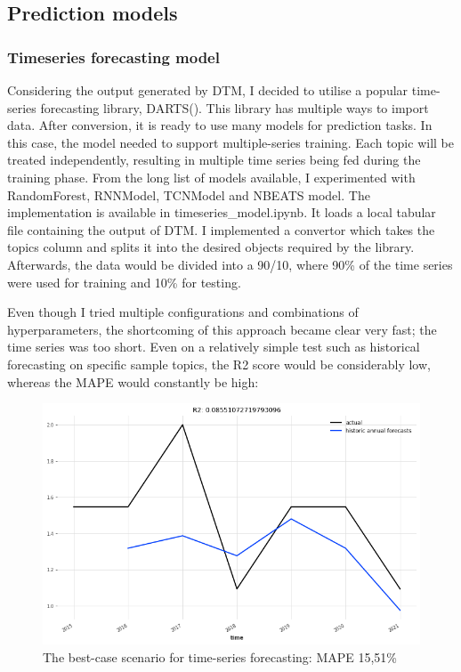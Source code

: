 \documentclass[12pt,MSc,a4paper,oneside]{muthesis}
\begin{document}
    \subsection{Prediction models}
    \subsubsection{Timeseries forecasting model}

    Considering the output generated by DTM, I decided to utilise a popular time-series forecasting library, DARTS(\cite{herzen2021darts}). This library has multiple ways to import data. After conversion, it is ready to use many models for prediction tasks. In this case, the model needed to support multiple-series training. Each topic will be treated independently, resulting in multiple time series being fed during the training phase. From the long list of models available, I experimented with RandomForest, RNNModel, TCNModel and NBEATS model.
    The implementation is available in timeseries\_model.ipynb. It loads a local tabular file containing the output of DTM. I implemented a convertor which takes the topics column and splits it into the desired objects required by the library. Afterwards, the data would be divided into a 90/10, where 90\% of the time series were used for training and 10\% for testing.

    Even though I tried multiple configurations and combinations of hyperparameters, the shortcoming of this approach became clear very fast; the time series was too short. Even on a relatively simple test such as historical forecasting on specific sample topics, the R2 score would be considerably low, whereas the MAPE would constantly be high:

    \begin{figure}[h]
      \centering
      \includegraphics[scale=0.3]{timeseries_forecasting_best_case_scenario.png}
      \caption{The best-case scenario for time-series forecasting: MAPE 15,51\%}
    \end{figure}
\end{document}
